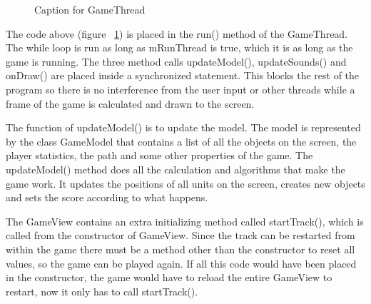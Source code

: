 \begin{figure}[htb]

\begin{small}

\end{small}

\caption{Caption for GameThread}
\label{fig:codeExGameThread}
\end{figure}

The code above (figure ~\ref{fig:codeExGameThread}) is placed in the run() method of the GameThread. The while loop is run as long as mRunThread is true, which it is as long as the game is running. The three method calls updateModel(), updateSounds() and onDraw() are placed inside a synchronized statement. This blocks the rest of the program so there is no interference from the user input or other threads while a frame of the game is calculated and drawn to the screen. 

The function of updateModel() is to update the model. The model is represented by the class GameModel that contains a list of all the objects on the screen, the player statistics, the path and some other properties of the game. The updateModel() method does all the calculation and algorithms that make the game work. It updates the positions of all units on the screen, creates new objects and sets the score according to what happens. 

The GameView contains an extra initializing method called startTrack(), which is called from the constructor of GameView. Since the track can be restarted from within the game there must be a method other than the constructor to reset all values, so the game can be played again. If all this code would have been placed in the constructor, the game would have to reload the entire GameView to restart, now it only has to call startTrack().